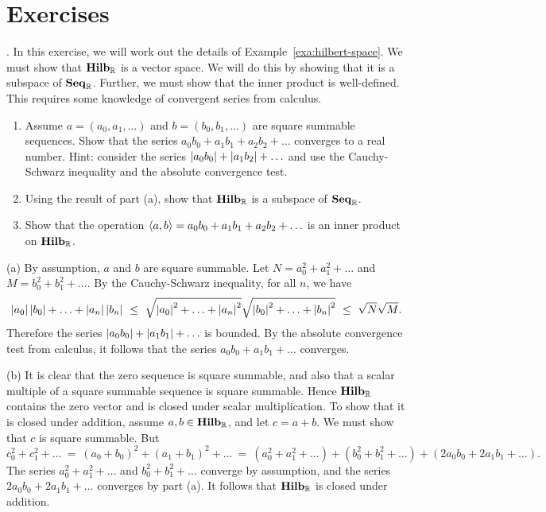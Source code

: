 \section*{Exercises}

\begin{ex}\label{ex:hilbert-space}.
  In this exercise, we will work out the details of
  Example~\ref{exa:hilbert-space}. We must show that $\mathbf{Hilb}_{\mathbb{R}}$ is a
  vector space. We will do this by showing that it is a subspace of
  $\mathbf{Seq}_{\mathbb{R}}$. Further, we must show that the inner product is
  well-defined. This requires some knowledge of convergent series from
  calculus.
  \begin{enumerate}
  \item Assume $a=(a_0,a_1,\ldots)$ and $b=(b_0,b_1,\ldots)$ are
    square summable sequences. Show that the series
    $a_0b_0 + a_1b_1 + a_2b_2 + \ldots$ converges to a real
    number. Hint: consider the series
    $\left|a_0b_0\right| + \left|a_1b_2\right| + \ldots$ and use the Cauchy-Schwarz
    inequality and the absolute convergence test.
  \item Using the result of part (a), show that $\mathbf{Hilb}_{\mathbb{R}}$ is a
    subspace of $\mathbf{Seq}_{\mathbb{R}}$.
  \item Show that the operation $\langle a,b\rangle = a_0b_0 + a_1b_1 +
    a_2b_2 + \ldots$ is an inner product on $\mathbf{Hilb}_{\mathbb{R}}$.
  \end{enumerate}
  \begin{sol}
    (a) By assumption, $a$ and $b$ are square summable. Let
    $N=a_0^2 + a_1^2 + \ldots$ and $M=b_0^2 + b_1^2 + \ldots$.
    By the Cauchy-Schwarz inequality, for all $n$, we have
    \begin{equation*}
      \left|a_0\right|\left|b_0\right| + \ldots + \left|a_n\right|\left|b_n\right|
      ~\leq~ \sqrt{\left|a_0\right|^2 + \ldots + \left|a_n\right|^2} \sqrt{\left|b_0\right|^2 + \ldots + \left|b_n\right|^2}
      ~\leq~ \sqrt{N}\sqrt{M}.
    \end{equation*}
    Therefore the series $\left|a_0b_0\right| + \left|a_1b_1\right| + \ldots$ is
    bounded. By the absolute convergence test from calculus, it
    follows that the series $a_0b_0 + a_1b_1 + \ldots$ converges.

    (b) It is clear that the zero sequence is square summable, and
    also that a scalar multiple of a square summable sequence is
    square summable. Hence $\mathbf{Hilb}_{\mathbb{R}}$ contains the zero vector and
    is closed under scalar multiplication. To show that it is closed
    under addition, assume $a,b\in\mathbf{Hilb}_{\mathbb{R}}$, and let $c=a+b$. We
    must show that $c$ is square summable. But
    \begin{equation*}
      c_0^2 + c_1^2 + \ldots
      ~=~
      (a_0+b_0)^2 + (a_1+b_1)^2 + \ldots
      ~=~ (a_0^2 + a_1^2 + \ldots) + (b_0^2 + b_1^2 + \ldots)
      + (2a_0b_0 + 2a_1b_1 + \ldots).
    \end{equation*}
    The series $a_0^2 + a_1^2 + \ldots$ and $b_0^2 + b_1^2 + \ldots$
    converge by assumption, and the series $2a_0b_0 + 2a_1b_1 +
    \ldots$ converges by part (a). It follows that $\mathbf{Hilb}_{\mathbb{R}}$ is
    closed under addition.


\end{sol}
\end{ex}
